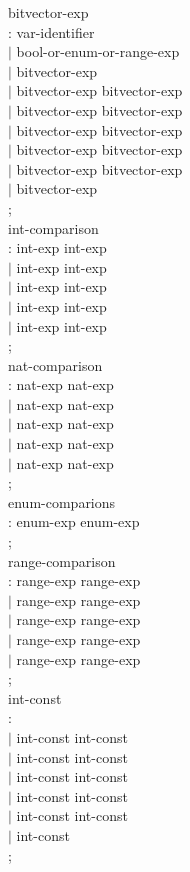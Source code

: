 \begin{tab}
\begin{tabbing}
bitvector-exp \\
\>: var-identifier \\
\>$|$ \ARRAYORBITVECID \LSQBRAC bool-or-enum-or-range-exp \RSQBRAC \\
\>$|$ \LPARA bitvector-exp \RPARA \\
\>$|$ bitvector-exp \AMPERSAND bitvector-exp \\
\>$|$ bitvector-exp \VERTBAR bitvector-exp \\
\>$|$ bitvector-exp \IMPLY  bitvector-exp \\
\>$|$ bitvector-exp \EQUIV  bitvector-exp \\
\>$|$ bitvector-exp \EQ bitvector-exp \\
\>$|$ \TILDE bitvector-exp \\
\>; \\


int-comparison \\
\>: int-exp \GT int-exp \\
\>$|$ int-exp \LT int-exp \\
\>$|$ int-exp \GE int-exp \\
\>$|$ int-exp \LE int-exp \\
\>$|$ int-exp \EQ int-exp \\
\>; \\


nat-comparison \\
\>: nat-exp \GT nat-exp \\
\>$|$ nat-exp \LT nat-exp \\
\>$|$ nat-exp \GE nat-exp \\
\>$|$ nat-exp \LE nat-exp \\
\>$|$ nat-exp \EQ nat-exp \\
\>; \\

enum-comparions\\
\>: enum-exp \EQ enum-exp \\
\>; \\


range-comparison\\
\>: range-exp \GT range-exp \\
\>$|$ range-exp \LT range-exp \\
\>$|$ range-exp \GE range-exp \\
\>$|$ range-exp \LE range-exp \\
\>$|$ range-exp \EQ range-exp \\
\>; \\

int-const \\
\>: \NATNUM \\
\>$|$ int-const \MINUS int-const \\
\>$|$ int-const \PLUS int-const \\
\>$|$ int-const \STAR int-const \\
\>$|$ int-const \SLASH int-const \\
\>$|$ int-const \PERCENT int-const \\
\>$|$ \LPARA int-const \RPARA \\
\>;\\



\end{tabbing}
\end{tab}
